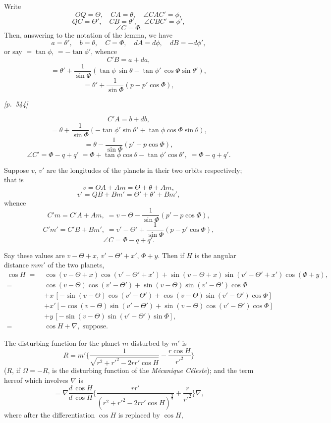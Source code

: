 \documentclass[11pt]{article}
\begin{document}
\medskip

Write
\[
OQ=\Theta,\quad CA=\theta,\quad\angle CAC'=\phi,
\]
\[
QC=\Theta',\quad CB=\theta',\quad\angle CBC'=\phi',
\]
\[
\angle C=\Phi.
\]
Then, answering to the notation of the lemma, we have
\[
a=\theta',\quad b=\theta,\quad C=\Phi,\quad dA=d\phi,\quad dB=-d\phi',
\]
or say $=\tan\phi$, $=-\tan\phi'$,
whence
\[
C'B=a+da,
\]
\[
=\theta'+\frac{1}{\sin\Phi}(\tan\phi\,\sin\theta-\tan\phi'\,\cos\Phi\sin\theta'),
\]
\[
=\theta'+\frac{1}{\sin\Phi}(p-p'\cos\Phi),
\]


\newpage
\noindent\textit{[p.~544]}

\medskip

\[
C'A=b+db,
\]
\[
=\theta+\frac{1}{\sin\Phi}(-\tan\phi'\sin\theta'+\tan\phi\cos\Phi\sin\theta),
\]
\[
=\theta-\frac{1}{\sin\Phi}(p'-p\cos\Phi),
\]
\[
\angle C'=\Phi-q+q'\;=\Phi+\tan\phi\cos\theta-\tan\phi'\cos\theta',\;=\Phi-q+q'.
\]

Suppose $v$, $v'$ are the longitudes of the planets in their two orbits
respectively; that is
\[
v=OA+Am=\Theta+\theta+Am,
\]
\[
v'=QB+Bm'=\Theta'+\theta'+Bm',
\]
whence
\[
C'm=C'A+Am,\;=v-\Theta-\frac{1}{\sin\Phi}(p'-p\cos\Phi),
\]
\[
C'm'=C'B+Bm',\;=v'-\Theta'+\frac{1}{\sin\Phi}(p-p'\cos\Phi),
\]
\[
\angle C=\Phi-q+q'.
\]

Say these values are $v-\Theta+x$, $v'-\Theta'+x'$, $\Phi+y$. Then if
$H$ is the angular distance $mm'$ of the two planets,
\[
\begin{aligned}
\cos H\;=\;&\cos(v-\Theta+x)\cos(v'-\Theta'+x')+\sin(v-\Theta+x)\sin(v'-\Theta'+x')\cos(\Phi+y),\\
=\;&\cos(v-\Theta)\cos(v'-\Theta')+\sin(v-\Theta)\sin(v'-\Theta')\cos\Phi\\
&+x\,[-\sin(v-\Theta)\cos(v'-\Theta')+\cos(v-\Theta)\sin(v'-\Theta')\cos\Phi]\\
&+x'[-\cos(v-\Theta)\sin(v'-\Theta')+\sin(v-\Theta)\cos(v'-\Theta')\cos\Phi]\\
&+y\,[-\sin(v-\Theta)\sin(v'-\Theta')\sin\Phi],\\
=\;&\cos H+\nabla,\;\text{suppose}.
\end{aligned}
\]

The disturbing function for the planet $m$ disturbed by $m'$ is
\[
R=m'\Big\{\frac{1}{\sqrt{r^2+r'^2-2rr'\cos H}}-\frac{r\cos H}{r'^2}\Big\}
\]
($R$, if $\Omega=-R$, is the disturbing function of the
\textit{M\'ecanique C\'eleste}); and the term hereof which involves
$\nabla$ is
\[
=\nabla\frac{d\,\cos H}{d\,\cos H}\Big\{\frac{rr'}{(r^2+r'^2-2rr'\cos H)^{\frac{3}{2}}}+\frac{r}{r'^2}\Big\}\nabla,
\]
where after the differentiation $\cos H$ is replaced by $\cos H$,
\end{document}
